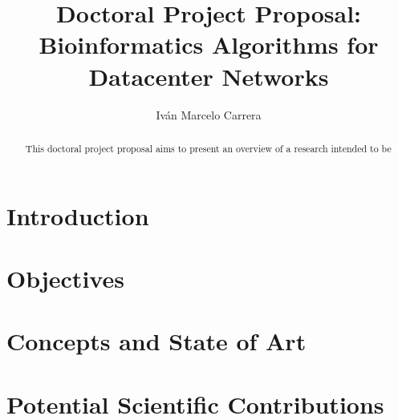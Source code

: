 \documentclass[12pt]{article}
\title{Doctoral Project Proposal: \\Bioinformatics Algorithms for Datacenter Networks}
\author{Iv{\'a}n Marcelo Carrera\inst{1}}
\begin{document}
 

\maketitle

\begin{abstract}

This doctoral project proposal aims to present an overview of a research intended to be
\end{abstract}
     
\section{Introduction}

\section{Objectives}

\section{Concepts and State of Art}

\section{Potential Scientific Contributions}

\cite{mapreduce-revisited}



\end{document}
